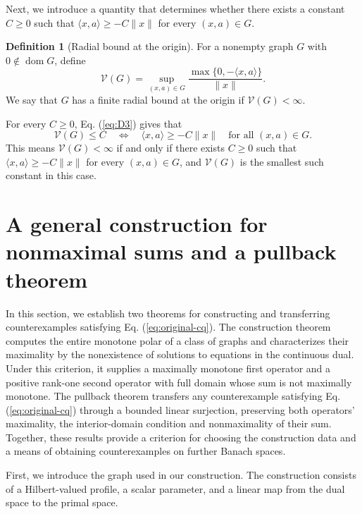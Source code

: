 \documentclass[11pt]{article}
\newcommand{\dom}{\operatorname{dom}}
\newcommand{\pair}[2]{\langle #1,#2\rangle}
\theoremstyle{definition}
\newtheorem{definition}{Definition}
\theoremstyle{remark}
\begin{document}
Next, we introduce a quantity that determines whether there exists a constant $C\ge0$ such that $\pair{x}{a}\ge-C\|x\|$ for every $(x,a)\in G$. 

\begin{definition}[Radial bound at the origin]
\label{def:radial-bound}
For a nonempty graph $G$ with $0\notin\dom G$, define
\begin{equation}
\mathcal V(G)=\sup_{(x,a)\in G}
 \frac{\max\{0,-\pair{x}{a}\}}{\|x\|}.
\label{eq:D3}
\end{equation}
We say that $G$ has a finite radial bound at the origin if $\mathcal V(G)<\infty$.
\end{definition}
For every $C\ge0$, Eq. (\ref{eq:D3}) gives that 
\[
\mathcal V(G)\le C
\quad\Longleftrightarrow\quad
\pair{x}{a}\ge-C\|x\|
\quad\text{for all }(x,a)\in G.
\]
This means $\mathcal V(G)<\infty$ if and only if there exists $C\ge0$ such that $\pair{x}{a}\ge-C\|x\|$ for every $(x,a)\in G$, and $\mathcal V(G)$ is the smallest such constant in this case. 





\section{A general construction for nonmaximal sums and a pullback theorem}
\label{sec:endpoint-criterion}

In this section, we establish two theorems for constructing and transferring counterexamples satisfying Eq. (\ref{eq:original-cq}). The construction theorem computes the entire monotone polar of a class of graphs and characterizes their maximality by the nonexistence of solutions to equations in the continuous dual. Under this criterion, it supplies a maximally monotone first operator and a positive rank-one second operator with full domain whose sum is not maximally monotone. The pullback theorem transfers any counterexample satisfying Eq. (\ref{eq:original-cq}) through a bounded linear surjection, preserving both operators' maximality, the interior-domain condition and nonmaximality of their sum. Together, these results provide a criterion for choosing the construction data and a means of obtaining counterexamples on further Banach spaces.






First, we introduce the graph used in our construction. The construction consists of a Hilbert-valued profile, a scalar parameter, and a linear map from the dual space to the primal space. 
\end{document}
